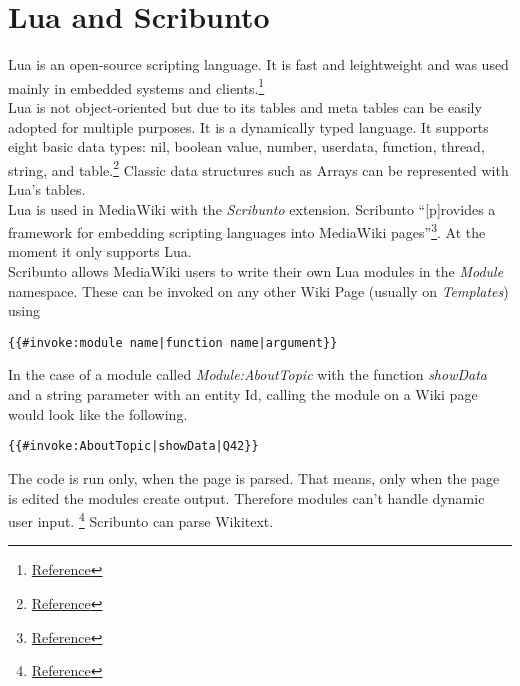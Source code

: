 \section{Lua and Scribunto}

Lua is an open-source scripting language. It is fast and leightweight and was used mainly in embedded systems and clients.\footnote{\href{http://www.lua.org/about.html}{Reference}} \\
Lua is not object-oriented but due to its tables and meta tables can be easily adopted for multiple purposes. It is a dynamically typed language. It supports eight basic data types: nil, boolean value, number, userdata, function, thread, string, and table.\footnote{\href{http://www.lua.org/pil/2.html}{Reference}} Classic data structures such as Arrays can be represented with Lua's tables. \\
Lua is used in MediaWiki with the \textit{Scribunto} extension. Scribunto ``[p]rovides a framework for embedding scripting languages into MediaWiki pages''\footnote{\href{https://www.mediawiki.org/wiki/Extension:Scribunto}{Reference}}. At the moment it only supports Lua. \\
Scribunto allows MediaWiki users to write their own Lua modules in the \textit{Module} namespace. These can be invoked on any other Wiki Page (usually on \textit{Templates}) using \\
\begin{lstlisting}[frame=single] 
{{#invoke:module name|function name|argument}}
\end{lstlisting}

In the case of a module called \textit{Module:AboutTopic} with the function \textit{showData} and a string parameter with an entity Id, calling the module on a Wiki page would look like the following. \\
\begin{lstlisting}[frame=single] 
{{#invoke:AboutTopic|showData|Q42}}
\end{lstlisting}

The code is run only, when the page is parsed. That means, only when the page is edited the modules create output. Therefore modules can't handle dynamic user input. \footnote{\href{https://en.wikipedia.org/wiki/Wikipedia:Lua}{Reference}} Scribunto can parse Wikitext. 
